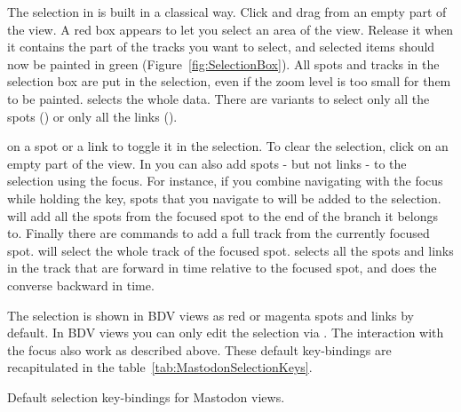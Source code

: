 The selection in \TrackScheme is built in a classical way. 
Click and drag from an empty part of the view.
A red box appears to let you select an area of the view.
Release it when it contains the part of the tracks you want to select, and selected items should now be painted in green (Figure~\ref{fig:SelectionBox}).
All spots and tracks in the selection box are put in the selection, even if the zoom level is too small for them to be painted.
 selects the whole data. 
There are variants to select only all the spots () or only all the links ().

 on a spot or a link to toggle it in the selection.
To clear the selection, click on an empty part of the \TrackScheme view.
In \TrackScheme you can also add spots - but not links - to the selection using the focus.
For instance, if you combine navigating with the focus while holding the \keys{\shift} key, spots that you navigate to will be added to the selection. 
\keys{\shift+\Alt+\arrowkeydown} will add all the spots from the focused spot to the end of the branch it belongs to.
Finally there are commands to add a full track from the currently focused spot. 
 will select the whole track of the focused spot.
 selects all the spots and links in the track that are forward in time relative to the focused spot, and  does the converse backward in time.

The selection is shown in BDV views as red or magenta spots and links by default.
In BDV views you can only edit the selection via .
The interaction with the focus also work as described above.
These default key-bindings are recapitulated in the table~\ref{tab:MastodonSelectionKeys}.

\begin{table}[!htbp]
    \centering
    \caption{Default selection key-bindings for Mastodon views.}
    
    \label{tab:MastodonSelectionKeys}
\end{table}


